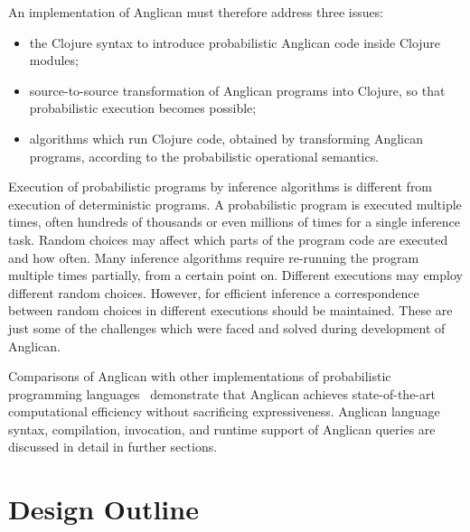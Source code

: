 \documentclass[preprint]{sigplanconf}
\begin{document}
An implementation of Anglican must therefore address three issues:
\begin{itemize}
    \item the Clojure syntax to introduce probabilistic Anglican
        code inside Clojure modules;
    \item source-to-source transformation of Anglican programs
        into Clojure, so that probabilistic execution becomes
        possible;
    \item algorithms which run Clojure code, obtained by
        transforming Anglican programs, according to the
        probabilistic operational semantics.
\end{itemize}
Execution of probabilistic programs by inference algorithms is
different from execution of deterministic programs.  A
probabilistic program is executed multiple times, often hundreds
of thousands or even millions of times for a single inference
task. Random choices may affect which parts of the program code
are executed and how often. Many inference algorithms require
re-running the program multiple times partially, from a certain
point on.  Different executions may employ different random
choices. However, for efficient inference a correspondence
between random choices in different executions should be
maintained. These are just some of the challenges which were
faced and solved during development of Anglican.

Comparisons of Anglican with other implementations of
probabilistic programming languages~\cite{SGG15}\cite[pp.
32--33]{P16} demonstrate that Anglican achieves state-of-the-art
computational efficiency without sacrificing expressiveness.
Anglican language syntax, compilation, invocation, and runtime
support of Anglican queries are discussed in detail in further
sections.

\section{Design Outline}
\label{sec:design}
\end{document}
